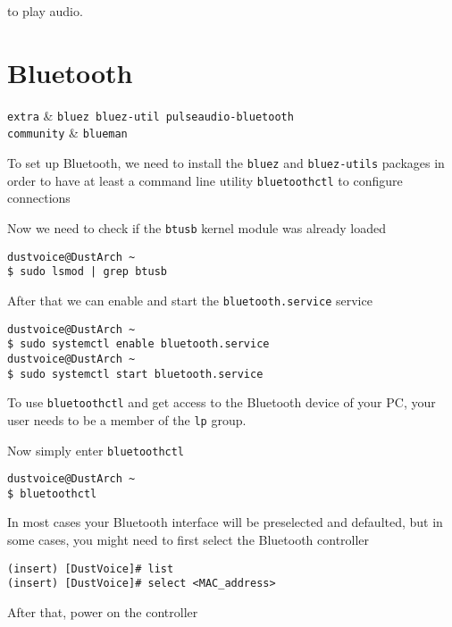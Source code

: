 \documentclass[10pt]{dustdoc}
\begin{document}
\noindent
to play audio.

\section{Bluetooth}
\label{sec:bluetooth}

\begin{packagetable}
    \texttt{extra} & \texttt{bluez bluez-util pulseaudio-bluetooth} \\ 
    \texttt{community} & \texttt{blueman} \\ 
\end{packagetable}

To set up Bluetooth, we need to install the \texttt{bluez} and \texttt{bluez-utils} packages in order to have at least a command line utility \texttt{bluetoothctl} to configure connections

Now we need to check if the \texttt{btusb} kernel module was already loaded

\begin{verbatim}
dustvoice@DustArch ~
$ sudo lsmod | grep btusb
\end{verbatim}

After that we can enable and start the \texttt{bluetooth.service} service

\begin{verbatim}
dustvoice@DustArch ~
$ sudo systemctl enable bluetooth.service
dustvoice@DustArch ~
$ sudo systemctl start bluetooth.service
\end{verbatim}

\begin{NOTE}
    To use \texttt{bluetoothctl} and get access to the Bluetooth device of your PC, your user needs to be a member of the \texttt{lp} group.
\end{NOTE}

Now simply enter \texttt{bluetoothctl}

\begin{verbatim}
dustvoice@DustArch ~
$ bluetoothctl
\end{verbatim}

In most cases your Bluetooth interface will be preselected and defaulted, but in some cases, you might need to first select the Bluetooth controller

\begin{verbatim}
(insert) [DustVoice]# list
(insert) [DustVoice]# select <MAC_address>
\end{verbatim}

After that, power on the controller
\end{document}
